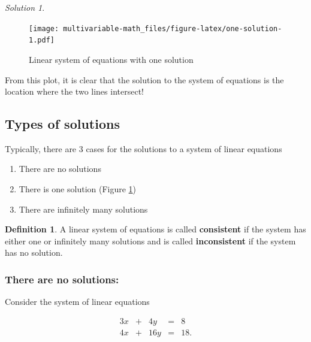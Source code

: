 \documentclass[
]{book}
\providecommand{\tightlist}{%
  \setlength{\itemsep}{0pt}\setlength{\parskip}{0pt}}
\theoremstyle{definition}
\newtheorem{definition}{Definition}[chapter]
\theoremstyle{definition}
\theoremstyle{definition}
\theoremstyle{definition}
\theoremstyle{remark}
\newtheorem*{solution}{Solution}
\begin{document}
\begin{solution}
\begin{figure}
\centering
\texttt{[image: multivariable-math\_files/figure-latex/one-solution-1.pdf]}
\caption{\label{fig:one-solution}Linear system of equations with one solution}
\end{figure}

From this plot, it is clear that the solution to the system of equations is the location where the two lines intersect!
\end{solution}

\hypertarget{types-of-solutions}{%
\subsection{Types of solutions}\label{types-of-solutions}}

Typically, there are 3 cases for the solutions to a system of linear equations

\begin{enumerate}
\def\labelenumi{\arabic{enumi})}
\tightlist
\item
  There are no solutions
\item
  There is one solution (Figure \ref{fig:one-solution})
\item
  There are infinitely many solutions
\end{enumerate}

\begin{definition}
A linear system of equations is called \textbf{consistent} if the system has either one or infinitely many solutions and is called \textbf{inconsistent} if the system has no solution.
\end{definition}

\hypertarget{there-are-no-solutions}{%
\subsubsection{There are no solutions:}\label{there-are-no-solutions}}

Consider the system of linear equations

\begin{alignat*}{3}
x   & {}+{} & 4 y & {}={} & 8 \\
4 x & {}+{} & 16 y & {}={} & 18.
\end{alignat*}
\end{document}
